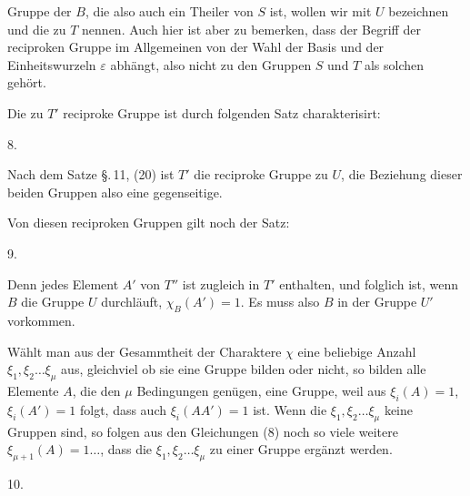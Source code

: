 Gruppe der $B$, die also auch ein Theiler von $S$ ist, wollen wir
mit $U$ bezeichnen und die zu $T$  nennen. Auch
hier ist aber zu bemerken, dass der Begriff der reciproken Gruppe
im Allgemeinen von der Wahl der Basis und der Einheitswurzeln
$\varepsilon$ abhängt, also nicht zu den Gruppen $S$ und $T$ als
solchen gehört.

Die zu $T'$ reciproke Gruppe ist durch folgenden Satz charakterisirt:

8.\ 

Nach dem Satze \S.\,11, (20) ist $T'$ die reciproke Gruppe zu $U$,
die Beziehung dieser beiden Gruppen also eine gegenseitige.

Von diesen reciproken Gruppen gilt noch der Satz:

9.\ 

Denn jedes Element $A'$ von $T''$ ist zugleich in $T'$ enthalten,
und folglich ist, wenn $B$ die Gruppe $U$ durchläuft,
$\chi_B(A') = 1$. Es muss also $B$ in der Gruppe $U'$ vorkommen.

Wählt man aus der Gesammtheit der Charaktere $\chi$ eine beliebige
Anzahl $\xi_1, \xi_2 \dots \xi_\mu$ aus, gleichviel ob sie eine
Gruppe bilden oder nicht, so bilden alle Elemente $A$, die den
$\mu$ Bedingungen
genügen, eine Gruppe, weil aus $\xi_i(A) = 1$, $\xi_i(A') = 1$
folgt, dass auch $\xi_i(AA') = 1$ ist. Wenn die
$\xi_1, \xi_2 \dots \xi_\mu$ keine Gruppen sind, so folgen aus den
Gleichungen (8) noch so viele weitere $\xi_{\mu+1}(A) = 1 \dots$,
dass die $\xi_1, \xi_2 \dots \xi_\mu$ zu einer Gruppe ergänzt
werden.

10.\ 
